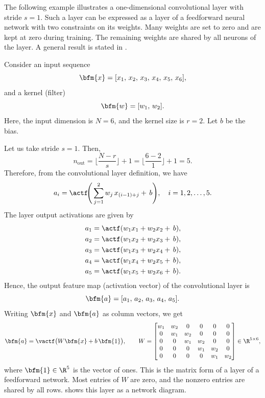 The following example illustrates a one-dimensional convolutional layer with stride $s=1$. Such a layer can be expressed as a layer of a feedforward neural network with two constraints on its weights. Many weights are set to zero and are kept at zero during training. The remaining weights are shared by all neurons of the layer. A general result is stated in .
\begin{example}[Convolutional Layer with Stride $s=1$]
Consider an input sequence
$$
\bfm{x} = [x_1,\, x_2,\, x_3,\, x_4,\, x_5,\, x_6],
$$
and a kernel (filter)
$$
\bfm{w} = [w_1,\, w_2].
$$
Here, the input dimension is $N=6$, and the kernel size is $r=2$. Let $b$ be the bias.

Let us take stride $s = 1$. Then,
$$
n_{\text{out}} = \Big\lfloor \frac{N - r}{s} \Big\rfloor + 1
= \Big\lfloor \frac{6 - 2}{1} \Big\rfloor + 1 = 5.
$$
Therefore, from the convolutional layer definition, we have
$$
a_i = \actf\!\Bigg(\sum_{j=1}^{2} w_j\, x_{(i-1) + j}+\,b\Bigg), 
\quad i = 1, 2, \ldots, 5.
$$
The layer output activations are given by
$$
\begin{aligned}
a_1 &= \actf(w_1 x_1 + w_2 x_2 +\,b),\\
a_2 &= \actf(w_1 x_2 + w_2 x_3 +\,b),\\
a_3 &= \actf(w_1 x_3 + w_2 x_4 +\,b),\\
a_4 &= \actf(w_1 x_4 + w_2 x_5 +\,b),\\
a_5 &= \actf(w_1 x_5 + w_2 x_6 +\,b).
\end{aligned}
$$
Hence, the output feature map (activation vector) of the convolutional layer is
$$
\bfm{a} = [a_1,\, a_2,\, a_3,\, a_4,\, a_5].
$$
Writing $\bfm{x}$ and $\bfm{a}$ as column vectors, we get
$$
\bfm{a} = \vactf\big(W\bfm{x} + b\,\bfm{1}\big),
\qquad
W =
\begin{bmatrix}
w_1 & w_2 & 0 & 0 & 0 & 0\\
0 & w_1 & w_2 & 0 & 0 & 0\\
0 & 0 & w_1 & w_2 & 0 & 0\\
0 & 0 & 0 & w_1 & w_2 & 0\\
0 & 0 & 0 & 0 & w_1 & w_2
\end{bmatrix}\in\R^{5\times 6},
$$
where $\bfm{1}\in\R^5$ is the vector of ones. This is the matrix form of a layer of a feedforward network. Most entries of $W$ are zero, and the nonzero entries are shared by all rows.
 shows this layer as a network diagram.
\end{example}
